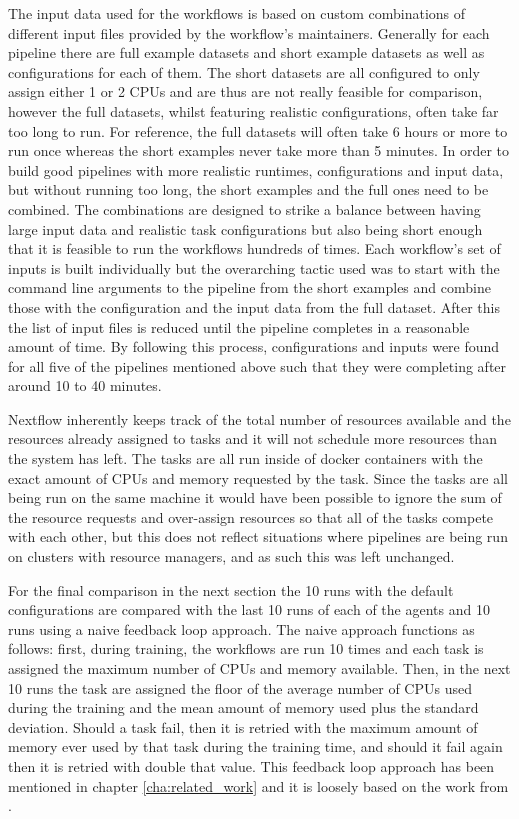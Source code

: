 The input data used for the workflows is based on custom combinations of different input files provided by the workflow's maintainers. Generally for each pipeline there are full example datasets and short example datasets as well as configurations for each of them. The short datasets are all configured to only assign either 1 or 2 CPUs and are thus are not really feasible for comparison, however the full datasets, whilst featuring realistic configurations, often take far too long to run. For reference, the full datasets will often take 6 hours or more to run once whereas the short examples never take more than 5 minutes. In order to build good pipelines with more realistic runtimes, configurations and input data, but without running too long, the short examples and the full ones need to be combined. The combinations are designed to strike a balance between having large input data and realistic task configurations but also being short enough that it is feasible to run the workflows hundreds of times. Each workflow’s set of inputs is built individually but the overarching tactic used was to start with the command line arguments to the pipeline from the short examples and combine those with the configuration and the input data from the full dataset. After this the list of input files is reduced until the pipeline completes in a reasonable amount of time. By following this process, configurations and inputs were found for all five of the pipelines mentioned above such that they were completing after around 10 to 40 minutes.  

Nextflow inherently keeps track of the total number of resources available and the resources already assigned to tasks and it will not schedule more resources than the system has left. The tasks are all run inside of docker containers with the exact amount of CPUs and memory requested by the task. Since the tasks are all being run on the same machine it would have been possible to ignore the sum of the resource requests and over-assign resources so that all of the tasks compete with each other, but this does not reflect situations where pipelines are being run on clusters with resource managers, and as such this was left unchanged.

For the final comparison in the next section the 10 runs with the default configurations are compared with the last 10 runs of each of the agents and 10 runs using a naive feedback loop approach. The naive approach functions as follows: first, during training, the workflows are run 10 times and each task is assigned the maximum number of CPUs and memory available. Then, in the next 10 runs the task are assigned the floor of the average number of CPUs used during the training and the mean amount of memory used plus the standard deviation. Should a task fail, then it is retried with the maximum amount of memory ever used by that task during the training time, and should it fail again then it is retried with double that value. This feedback loop approach has been mentioned in chapter \ref{cha:related_work} and it is loosely based on the work from \cite{tovarjob,FeedbackBasedAllocation}.



